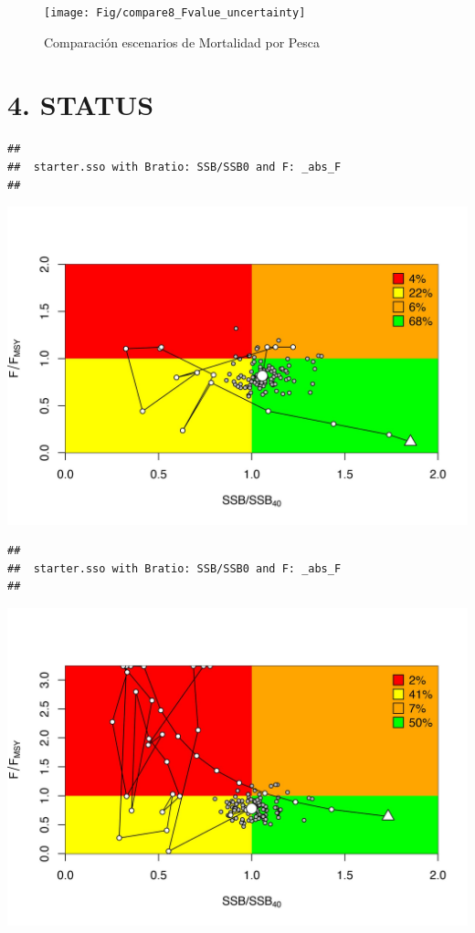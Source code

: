\documentclass[
]{article}
\begin{document}
\begin{figure}[H]

{\centering \texttt{[image: Fig/compare8\_Fvalue\_uncertainty]} 

}

\caption{\label{fig:ftotal}Comparación escenarios de Mortalidad por Pesca}\label{fig:ftotal}
\end{figure}

\hypertarget{status}{%
\section{4. STATUS}\label{status}}

\begin{verbatim}
## 
##  starter.sso with Bratio: SSB/SSB0 and F: _abs_F 
## 
\end{verbatim}

\begin{center}\includegraphics{Dtrunculus_SS3_2024_files/figure-latex/unnamed-chunk-19-1} \end{center}

\begin{verbatim}
## 
##  starter.sso with Bratio: SSB/SSB0 and F: _abs_F 
## 
\end{verbatim}

\begin{center}\includegraphics{Dtrunculus_SS3_2024_files/figure-latex/unnamed-chunk-19-2} \end{center}
\end{document}
